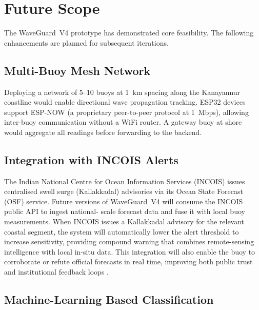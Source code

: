 \chapter{Future Scope}
\label{chap:future}

The WaveGuard~V4 prototype has demonstrated core feasibility.
The following enhancements are planned for subsequent iterations.

\section{Multi-Buoy Mesh Network}

Deploying a network of 5--10 buoys at 1~km spacing along the Kanayannur coastline
would enable directional wave propagation tracking.
ESP32 devices support ESP-NOW (a proprietary peer-to-peer protocol at 1~Mbps),
allowing inter-buoy communication without a WiFi router.
A gateway buoy at shore would aggregate all readings before forwarding to the backend.

\section{Integration with INCOIS Alerts}

The Indian National Centre for Ocean Information Services (INCOIS) issues centralised
swell surge (Kallakkadal) advisories via its Ocean State Forecast (OSF) service.
Future versions of WaveGuard~V4 will consume the INCOIS public API to ingest national-
scale forecast data and fuse it with local buoy measurements.
When INCOIS issues a Kallakkadal advisory for the relevant coastal segment, the system
will automatically lower the alert threshold to increase sensitivity, providing compound
warning that combines remote-sensing intelligence with local in-situ data.
This integration will also enable the buoy to corroborate or refute official forecasts
in real time, improving both public trust and institutional feedback loops
\cite{incois2024kallakkadal}.

\section{Machine-Learning Based Classification}

